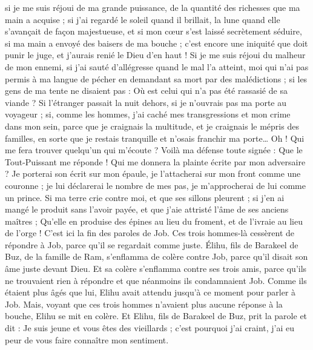 \begin{multicols}{2}
si je me suis réjoui de ma grande puissance, de la quantité des richesses que ma main a acquise ;
si j'ai regardé le soleil quand il brillait, la lune quand elle s'avançait de façon majestueuse,
et si mon cœur s'est laissé secrètement séduire, si ma main a envoyé des baisers de ma bouche ;
c'est encore une iniquité que doit punir le juge, et j'aurais renié le Dieu d'en haut !
Si je me suis réjoui du malheur de mon ennemi, si j'ai sauté d'allégresse quand le mal l'a atteint,
moi qui n'ai pas permis à ma langue de pécher en demandant sa mort par des malédictions ;
si les gens de ma tente ne disaient pas : Où est celui qui n'a pas été rassasié de sa viande ?
Si l'étranger passait la nuit dehors, si je n'ouvrais pas ma porte au voyageur ;
si, comme les hommes, j'ai caché mes transgressions et mon crime dans mon sein,
parce que je craignais la multitude, et je craignais le mépris des familles, en sorte que je restais tranquille et n'osais franchir ma porte…
Oh ! Qui me fera trouver quelqu'un qui m'écoute ? Voilà ma défense toute signée : Que le Tout-Puissant me réponde ! Qui me donnera la plainte écrite par mon adversaire ?
Je porterai son écrit sur mon épaule, je l'attacherai sur mon front comme une couronne ;
je lui déclarerai le nombre de mes pas, je m'approcherai de lui comme un prince.
Si ma terre crie contre moi, et que ses sillons pleurent ;
si j'en ai mangé le produit sans l'avoir payée, et que j'aie attristé l'âme de ses anciens maîtres ;
Qu'elle en produise des épines au lieu du froment, et de l'ivraie au lieu de l'orge ! C'est ici la fin des paroles de Job.
\VerseOne{}Ces trois hommes-là cessèrent de répondre à Job, parce qu'il se regardait comme juste.
Élihu, fils de Barakeel de Buz, de la famille de Ram, s'enflamma de colère contre Job, parce qu'il disait son âme juste devant Dieu.
Et sa colère s'enflamma contre ses trois amis, parce qu'ils ne trouvaient rien à répondre et que néanmoins ils condamnaient Job.
Comme ils étaient plus âgés que lui, Elihu avait attendu jusqu'à ce moment pour parler à Job.
Mais, voyant que ces trois hommes n'avaient plus aucune réponse à la bouche, Elihu se mit en colère.
Et Elihu, fils de Barakeel de Buz, prit la parole et dit : Je suis jeune et vous êtes des vieillards ; c'est pourquoi j'ai craint, j'ai eu peur de vous faire connaître mon sentiment.

\end{multicols}
